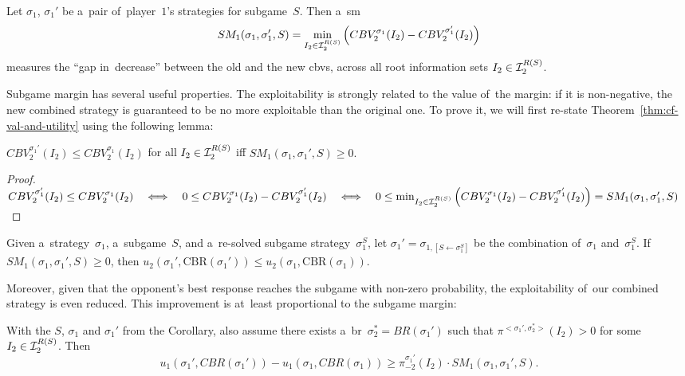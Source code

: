 \begin{defn}[\acrlong{sm}]
  Let $\sigma_1$, $\sigma_1'$ be a~pair of~player~$1$'s strategies for subgame~$S$.
  Then a~\acrlong{sm}
  \[
    SM_1 (\sigma_1, \sigma_1' , S) =
    \min_{I_2 \in \mathcal{I}_2^{R(S)}}
    \left( CBV_2^{\sigma_1} (I_2) - CBV_2^{\sigma_1'} (I_2) \right)
  \]
  measures the ``gap in~decrease'' between the old and the new \acrlong{cbv}s, across all root information sets $I_2 \in \mathcal{I}_2^{R(S)}$.
\end{defn}

Subgame margin has several useful properties.
The exploitability is strongly related to the value of~the margin:
if it is non-negative, the new combined strategy is guaranteed to be no more exploitable than the original one.
To prove it, we will first re-state Theorem~\ref{thm:cf-val-and-utility} using the following lemma:
\begin{lem}
  \label{lem:cbv-and-sm}
  $CBV_2^{\sigma_1'} (I_2) \leq CBV_2^{\sigma_1} (I_2)$ for all $I_2 \in \mathcal{I}_2^{R(S)}$
  iff
  $SM_1 (\sigma_1, \sigma_1' , S) \geq 0.$
\end{lem}
\begin{proof}
  $
  CBV_2^{\sigma_1'} (I_2) \leq CBV_2^{\sigma_1} (I_2)
  \quad \Longleftrightarrow \quad
  0 \leq CBV_2^{\sigma_1} (I_2) - CBV_2^{\sigma_1'} (I_2)
  \quad \Longleftrightarrow \quad
  0 \leq \min_{I_2 \in \mathcal{I}_2^{R(S)}} \left( CBV_2^{\sigma_1} (I_2) - CBV_2^{\sigma_1'} (I_2) \right)
  = SM_1 (\sigma_1, \sigma_1' , S)
  $
\end{proof}

\begin{cor}
  \label{cor:sm-and-utility}
  Given a~strategy~$\sigma_1$, a~subgame~$S$, and a~re-solved subgame strategy~$\sigma_1^S$, let $\sigma_1' = \sigma_{1, [S \leftarrow \sigma_1^S]}$ be the combination of~$\sigma_1$ and~$\sigma_1^S$.
  If $SM_1 (\sigma_1, \sigma_1' , S) \geq 0$, then $u_2(\sigma_1', \textrm{CBR}(\sigma_1')) \leq  u_2(\sigma_1, \textrm{CBR}(\sigma_1))$.
\end{cor}

Moreover, given that the opponent's best response reaches the subgame with non-zero probability, the exploitability of~our combined strategy is even reduced.
This improvement is at~least proportional to the subgame margin:

\begin{thm}
  \label{thm:improvement-propto-sm}
  With the $S$, $\sigma_1$ and $\sigma_1'$ from the Corollary, also assume there exists a~\acrlong{br}~$\sigma_2^* = BR(\sigma_1')$ such that $\pi^{<\sigma_1',\sigma_2^*>} (I_2) > 0$ for some $I_2 \in\mathcal{I}_2^{R(S)}$.
  Then 
  \[
    u_1(\sigma_1', CBR(\sigma_1')) - u_1(\sigma_1, CBR(\sigma_1)) \ge \pi_{-2}^{\sigma_1'} (I_2) \cdot SM_1(\sigma_1, \sigma_1', S).
  \]
\end{thm}

